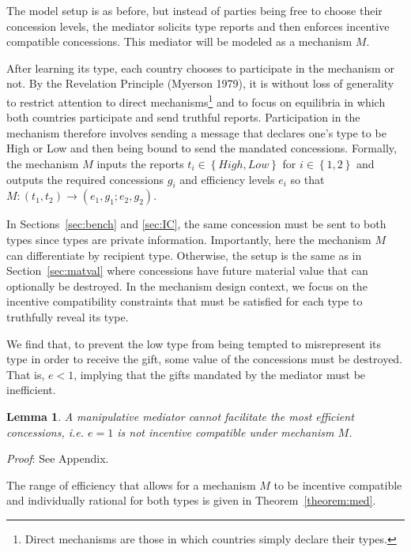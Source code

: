 \documentclass[12pt, letterpaper]{article}
\newtheorem{lemma}{Lemma}
\begin{document}
The model setup is as before, but instead of parties being free to choose their concession levels, the mediator solicits type reports and then enforces incentive compatible concessions. This mediator will be modeled as a mechanism $M$.

After learning its type, each country chooses to participate in the mechanism or not. By the Revelation Principle (Myerson 1979), it is without loss of generality to restrict attention to direct mechanisms\footnote{Direct mechanisms are those in which countries simply declare their types.} and to focus on equilibria in which both countries participate and send truthful reports. Participation in the mechanism therefore involves sending a message that declares one's type to be High or Low and then being bound to send the mandated concessions. Formally, the mechanism $M$ inputs the reports $t_i \in \left\{High,Low\right\}$ for $i \in \left\{1,2\right\}$ and outputs the required concessions $g_i$ and efficiency levels $e_i$ so that $ M:(t_1,t_2)\rightarrow( e_1, g_1; e_2,g_2)$.

In Sections~\ref{sec:bench} and \ref{sec:IC}, the same concession must be sent to both types since types are private information. Importantly, here the mechanism $M$ can differentiate by recipient type. Otherwise, the setup is the same as in Section~\ref{sec:matval} where concessions have future material value that can optionally be destroyed. In the mechanism design context, we focus on the incentive compatibility constraints that must be satisfied for each type to truthfully reveal its type.

We find that, to prevent the low type from being tempted to misrepresent its type in order to receive the gift, some value of the concessions must be destroyed. That is, $e<1$, implying that the gifts mandated by the mediator must be inefficient. 

\begin{lemma}
	A manipulative mediator cannot facilitate the most efficient concessions, i.e. $e=1$ is not incentive compatible under mechanism $M$. 
	\label{lemma:med}
\end{lemma}
\emph{Proof}: See Appendix.

The range of efficiency that allows for a mechanism $M$ to be incentive compatible and individually rational for both types is given in Theorem~\ref{theorem:med}.
\end{document}
